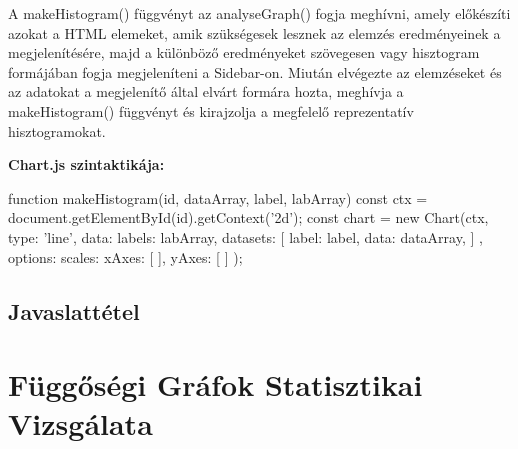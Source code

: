 A makeHistogram() függvényt az analyseGraph() fogja meghívni, amely előkészíti azokat a HTML elemeket, amik szükségesek lesznek az elemzés eredményeinek a megjelenítésére, majd a különböző eredményeket szövegesen vagy hisztogram formájában fogja megjeleníteni a Sidebar-on. Miután elvégezte az elemzéseket és az adatokat a megjelenítő által elvárt formára hozta, meghívja a makeHistogram() függvényt és kirajzolja a megfelelő reprezentatív hisztogramokat. 

\pagebreak
 
\noindent\textbf{Chart.js szintaktikája:}
 
\begin{cpp}
function makeHistogram(id, dataArray, label, labArray){
	const ctx = document.getElementById(id).getContext('2d');
	const chart = new Chart(ctx, {
		type: 'line',
		data: {
			labels: labArray,
			datasets: [{
				label: label,
				data: dataArray,
			}]
		},
		options: {
			scales: {
				xAxes: [{
				}],
				yAxes: [{
				}]
			}
		}
	});
}	
\end{cpp}





\subsection{Javaslattétel}

\section{Függőségi Gráfok Statisztikai Vizsgálata}











